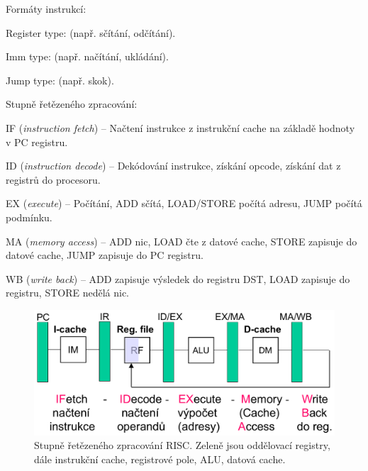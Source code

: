 \begin{compactitem}
    \item Formáty instrukcí: \begin{compactitem}
        \item Register type:     (např. sčítání, odčítání).

        \item Imm type:     (např. načítání, ukládání).

        \item Jump type:  (např. skok).
    \end{compactitem}

    \item Stupně řetězeného zpracování: \begin{compactitem}
        \item IF (\textit{instruction fetch}) -- Načtení instrukce z instrukční cache na základě hodnoty v PC registru.

        \item ID (\textit{instruction decode}) -- Dekódování instrukce, získání opcode, získání dat z registrů do procesoru.

        \item EX (\textit{execute}) -- Počítání, ADD sčítá, LOAD/STORE počítá adresu, JUMP počítá podmínku.

        \item MA (\textit{memory access}) -- ADD nic, LOAD čte z datové cache, STORE zapisuje do datové cache, JUMP zapisuje do PC registru.

        \item WB (\textit{write back}) -- ADD zapisuje výsledek do registru DST, LOAD zapisuje do registru, STORE nedělá nic.
    \end{compactitem}

    \begin{figure}[H]
        \centering
        \includegraphics[width=1\linewidth]{risc_stupne_retezeneho_zpracovani.pdf}
        \caption{Stupně řetězeného zpracování RISC. Zeleně jsou oddělovací registry, dále instrukční cache, registrové pole, ALU, datová cache.}
    \end{figure}


\end{compactitem}
